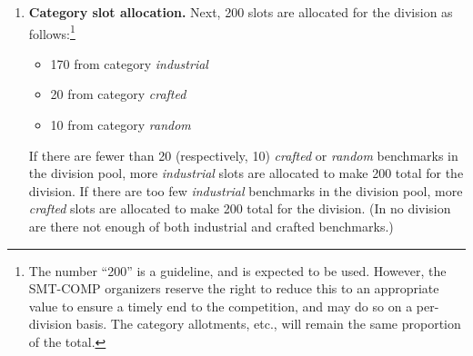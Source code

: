 \documentclass[12pt]{article}
\begin{document}
\begin{enumerate}
\item\textbf{Category slot allocation.} %
  Next, 200 slots are allocated for the division as follows:\footnote{The
  number ``200'' is a guideline, and is expected to be used.  However, the
  SMT-COMP organizers reserve the right to reduce this to an appropriate
  value to ensure a timely end to the competition, and may do so on a
  per-division basis.  The category allotments, etc., will remain the same
  proportion of the total.}
%
  \begin{itemize}
  \item 170 from category \emph{industrial}
  \item 20 from category \emph{crafted}
  \item 10 from category \emph{random}
  \end{itemize}
%
  If there are fewer than 20 (respectively, 10) \emph{crafted} or
  \emph{random} benchmarks in the division pool, more
  \emph{industrial} slots are allocated to make 200 total for the
  division.  If there are too few \emph{industrial} benchmarks in the
  division pool, more \emph{crafted} slots are allocated to make 200
  total for the division.  (In no division are there not enough of
  both industrial and crafted benchmarks.)


\end{enumerate}
\end{document}
